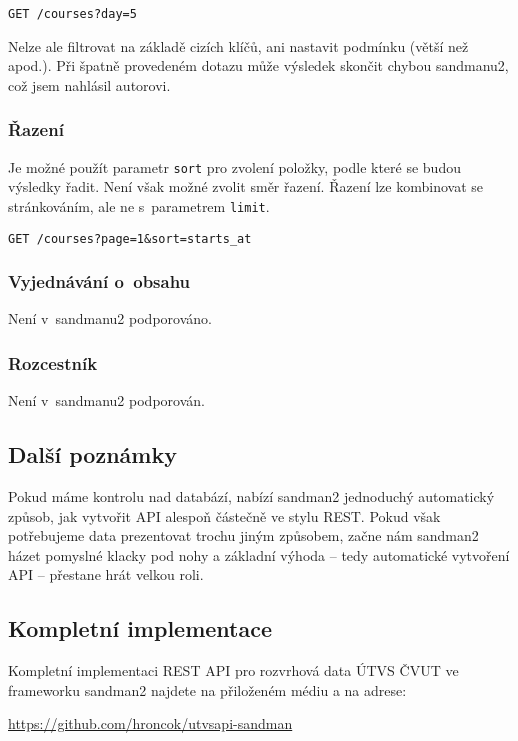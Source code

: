 \verb!GET /courses?day=5!

Nelze ale filtrovat na základě cizích klíčů, ani nastavit podmínku (větší než apod.). Při špatně provedeném dotazu může výsledek skončit chybou sandmanu2, což jsem nahlásil autorovi.

\subsubsection*{Řazení}\label{ux159azenuxed}

Je možné použít parametr \verb!sort! pro zvolení položky, podle které se budou výsledky řadit. Není však možné zvolit směr řazení. Řazení lze kombinovat se stránkováním, ale ne s~parametrem \verb!limit!.

\verb!GET /courses?page=1&sort=starts_at!

\subsubsection*{Vyjednávání o~obsahu}\label{vyjednuxe1vuxe1nuxed-o-obsahu}

Není v~sandmanu2 podporováno.

\subsubsection*{Rozcestník}\label{rozcestnuxedk}

Není v~sandmanu2 podporován.

\subsection{Další poznámky}\label{dalux161uxed-poznuxe1mky}

Pokud máme kontrolu nad databází, nabízí sandman2 jednoduchý automatický způsob, jak vytvořit API alespoň částečně ve stylu REST. Pokud však potřebujeme data prezentovat trochu jiným způsobem, začne nám sandman2 házet pomyslné klacky pod nohy a základní výhoda -- tedy automatické vytvoření API -- přestane hrát velkou roli.

\subsection{Kompletní implementace}\label{kompletnuxed-implementace}

Kompletní implementaci REST API pro rozvrhová data ÚTVS ČVUT ve frameworku sandman2 najdete na přiloženém médiu a na adrese:

\url{https://github.com/hroncok/utvsapi-sandman}
